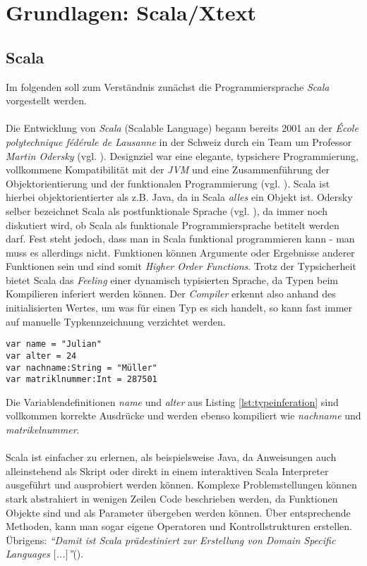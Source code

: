 \chapter{Grundlagen: Scala/Xtext}
\section{Scala}
Im folgenden soll zum Verständnis zunächst die Programmiersprache \textit{Scala} vorgestellt werden.\\\\Die Entwicklung von \textit{Scala} (Scalable Language) begann bereits 2001 an der\textit{ École polytechnique fédérale de Lausanne} in der Schweiz durch ein Team um Professor \textit{Martin Odersky} (vgl. ). Designziel war eine elegante, typsichere Programmierung, vollkommene Kompatibilität mit der \textit{JVM} und eine Zusammenführung der Objektorientierung und der funktionalen Programmierung (vgl. ). Scala ist hierbei objektorientierter als z.B. Java, da in Scala \textit{alles} ein Objekt ist. Odersky selber bezeichnet Scala als postfunktionale Sprache (vgl. ), da immer noch diskutiert wird, ob Scala als funktionale Programmiersprache betitelt werden darf. Fest steht jedoch, dass man in Scala funktional programmieren kann - man muss es allerdings nicht. Funktionen können Argumente oder Ergebnisse anderer Funktionen sein und sind somit \textit{Higher Order Functions}. Trotz der Typsicherheit bietet Scala das \textit{Feeling} einer dynamisch typisierten Sprache, da Typen beim Kompilieren inferiert werden können. Der \textit{Compiler} erkennt also anhand des initialisierten Wertes, um was für einen Typ es sich handelt, so kann fast immer auf manuelle Typkennzeichnung verzichtet werden.
\begin{lstlisting}[style = scala, caption = {Beispielhafte Varablendefinition mit Typinferierung und manueller Typangabe}, label = {lst:typeinferation}]
var name = "Julian"
var alter = 24
var nachname:String = "Müller"
var matriklnummer:Int = 287501
\end{lstlisting}
Die Variablendefinitionen \textit{name} und \textit{alter} aus Listing \ref{lst:typeinferation} sind vollkommen korrekte Ausdrücke und werden ebenso kompiliert wie \textit{nachname} und \textit{matrikelnummer}.\\\\Scala ist einfacher zu erlernen, als beispielsweise Java, da Anweisungen auch alleinstehend als Skript oder direkt in einem interaktiven Scala Interpreter ausgeführt und ausprobiert werden können. 
Komplexe Problemstellungen können stark abstrahiert in wenigen Zeilen Code beschrieben werden, da Funktionen Objekte sind und als Parameter übergeben werden können. Über entsprechende Methoden, kann man sogar eigene Operatoren und Kontrollstrukturen erstellen. Übrigens: \textit{"`Damit ist Scala prädestiniert zur Erstellung von Domain Specific Languages $[$...$]$"'}().
